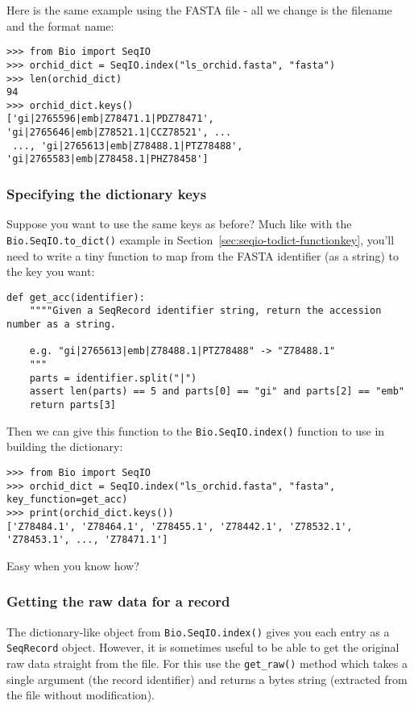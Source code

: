 Here is the same example using the FASTA file - all we change is the
filename and the format name:

\begin{verbatim}
>>> from Bio import SeqIO
>>> orchid_dict = SeqIO.index("ls_orchid.fasta", "fasta")
>>> len(orchid_dict)
94
>>> orchid_dict.keys()
['gi|2765596|emb|Z78471.1|PDZ78471', 'gi|2765646|emb|Z78521.1|CCZ78521', ...
 ..., 'gi|2765613|emb|Z78488.1|PTZ78488', 'gi|2765583|emb|Z78458.1|PHZ78458']
\end{verbatim}

\subsubsection{Specifying the dictionary keys}
\label{sec:seqio-index-functionkey}

Suppose you want to use the same keys as before? Much like with the
\verb|Bio.SeqIO.to_dict()| example in Section~\ref{sec:seqio-todict-functionkey},
you'll need to write a tiny function to map from the FASTA identifier
(as a string) to the key you want:

\begin{verbatim}
def get_acc(identifier):
    """"Given a SeqRecord identifier string, return the accession number as a string.

    e.g. "gi|2765613|emb|Z78488.1|PTZ78488" -> "Z78488.1"
    """
    parts = identifier.split("|")
    assert len(parts) == 5 and parts[0] == "gi" and parts[2] == "emb"
    return parts[3]
\end{verbatim}

\noindent Then we can give this function to the \verb|Bio.SeqIO.index()|
function to use in building the dictionary:

\begin{verbatim}
>>> from Bio import SeqIO
>>> orchid_dict = SeqIO.index("ls_orchid.fasta", "fasta", key_function=get_acc)
>>> print(orchid_dict.keys())
['Z78484.1', 'Z78464.1', 'Z78455.1', 'Z78442.1', 'Z78532.1', 'Z78453.1', ..., 'Z78471.1']
\end{verbatim}

\noindent Easy when you know how?

\subsubsection{Getting the raw data for a record}
\label{sec:seqio-index-getraw}

The dictionary-like object from \verb|Bio.SeqIO.index()| gives you each
entry as a \verb|SeqRecord| object. However, it is sometimes useful to
be able to get the original raw data straight from the file. For this
use the \verb|get_raw()| method which takes a
single argument (the record identifier) and returns a bytes string
(extracted from the file without modification).

